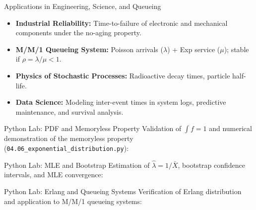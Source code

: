 \documentclass[aspectratio=169,xcolor={dvipsnames,table}]{beamer}
\begin{document}
\begin{frame}{Applications in Engineering, Science, and Queueing}
	\vspace{-0.1cm}
	\begin{itemize}\itemsep=0.1cm
		\item \textbf{Industrial Reliability:} Time-to-failure of electronic and mechanical components under the no-aging property. \pause
		\item \textbf{M/M/1 Queueing System:} Poisson arrivals ($\lambda$) + Exp service ($\mu$); stable if $\rho = \lambda/\mu < 1$. \pause
		\item \textbf{Physics of Stochastic Processes:} Radioactive decay times, particle half-life. \pause
		\item \textbf{Data Science:} Modeling inter-event times in system logs, predictive maintenance, and survival analysis.
	\end{itemize}
\end{frame}

\begin{frame}[fragile]{Python Lab: PDF and Memoryless Property}
	\vspace{-0.05cm}
	\scriptsize
	Validation of $\int f = 1$ and numerical demonstration of the memoryless property (\texttt{04.06\_exponential\_distribution.py}):
	\vspace{0.02cm}
	{
	}
\end{frame}

\begin{frame}[fragile]{Python Lab: MLE and Bootstrap}
	\vspace{-0.05cm}
	\scriptsize
	Estimation of $\hat{\lambda} = 1/\bar{X}$, bootstrap confidence intervals, and MLE convergence:
	\vspace{0.02cm}
	{
	}
\end{frame}

\begin{frame}[fragile]{Python Lab: Erlang and Queueing Systems}
	\vspace{-0.05cm}
	\scriptsize
	Verification of Erlang distribution and application to M/M/1 queueing systems:
	\vspace{0.02cm}
	{
	}
\end{frame}
\end{document}
